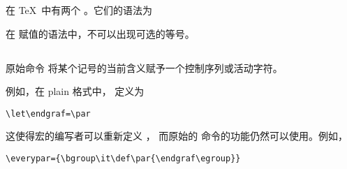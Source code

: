 \documentclass{book}
\begin{document}
在 \TeX\ 中有两个 。它们的语法为
\begin{disp}%
     \nl
     \end{disp}
在  赋值的语法中，不可以出现可选的等号。

\subsection{\protect{}}
\label{let}

原始命令  将某个记号的当前含义赋予一个控制序列或活动字符。

例如，在 plain 格式中， 定义为
\begin{verbatim}
\let\endgraf=\par
\end{verbatim}
这使得宏的编写者可以重新定义 ，
而原始的  命令的功能仍然可以使用。例如，
\begin{verbatim}
\everypar={\bgroup\it\def\par{\endgraf\egroup}}
\end{verbatim}
\end{document}
